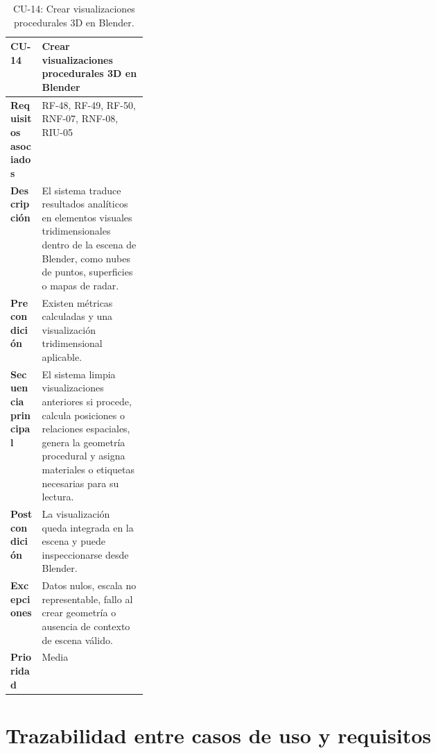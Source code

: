 \begin{table}[H]
\centering
\scriptsize
\begin{tabularx}{\linewidth}{p{0.23\linewidth}X}
\toprule
\textbf{CU-14} & Crear visualizaciones procedurales 3D en Blender \\
\midrule
\textbf{Requisitos asociados} & RF-48, RF-49, RF-50, RNF-07, RNF-08, RIU-05 \\
\textbf{Descripción} & El sistema traduce resultados analíticos en elementos visuales tridimensionales dentro de la escena de Blender, como nubes de puntos, superficies o mapas de radar. \\
\textbf{Precondición} & Existen métricas calculadas y una visualización tridimensional aplicable. \\
\textbf{Secuencia principal} & El sistema limpia visualizaciones anteriores si procede, calcula posiciones o relaciones espaciales, genera la geometría procedural y asigna materiales o etiquetas necesarias para su lectura. \\
\textbf{Postcondición} & La visualización queda integrada en la escena y puede inspeccionarse desde Blender. \\
\textbf{Excepciones} & Datos nulos, escala no representable, fallo al crear geometría o ausencia de contexto de escena válido. \\
\textbf{Prioridad} & Media \\
\bottomrule
\end{tabularx}
\caption{CU-14: Crear visualizaciones procedurales 3D en Blender.}
\label{tab:cu14}
\end{table}

\section{Trazabilidad entre casos de uso y requisitos}

